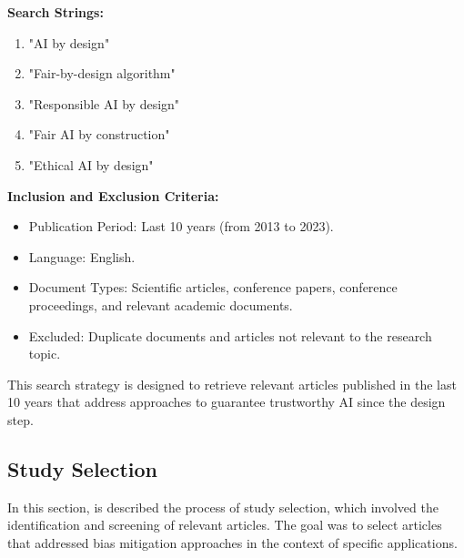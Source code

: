 \documentclass{article}
\begin{document}
\textbf{Search Strings:}

\begin{enumerate}

    \item "AI by design"

    \item "Fair-by-design algorithm"

    \item "Responsible AI by design"

    \item "Fair AI by construction"

    \item "Ethical AI by design"

\end{enumerate}

\textbf{Inclusion and Exclusion Criteria:}

\begin{itemize}

    \item Publication Period: Last 10 years (from 2013 to 2023).

    \item Language: English.

    \item Document Types: Scientific articles, conference papers, conference proceedings, and relevant academic documents.

    \item Excluded: Duplicate documents and articles not relevant to the research topic.

\end{itemize}

This search strategy is designed to retrieve relevant articles published in the last 10 years that address approaches to guarantee trustworthy AI since the design step.

\subsection{Study Selection}

In this section, is described the process of study selection, which involved the identification and screening of relevant articles. The goal was to select articles that addressed bias mitigation approaches in the context of specific applications.
\end{document}
